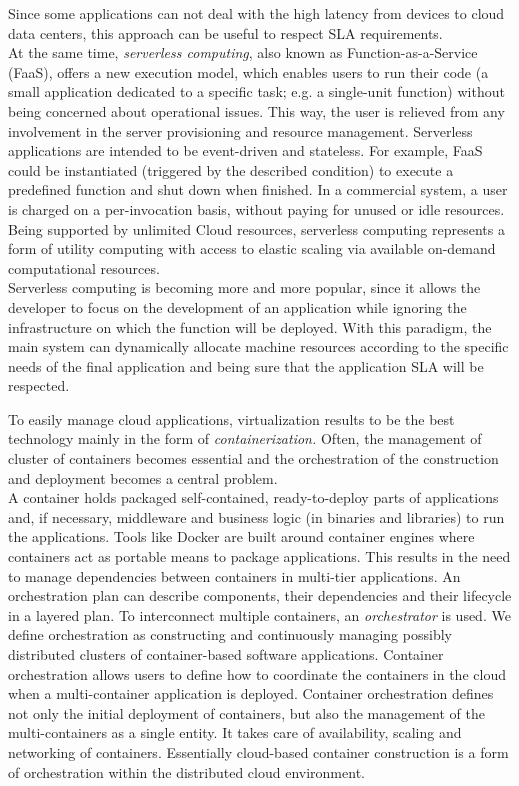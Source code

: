 Since some applications can not deal with the high latency from devices to cloud data centers, this approach
can be useful to respect SLA requirements. \\
At the same time, \textit{serverless computing}, also known as Function-as-a-Service (FaaS), offers a new execution model, which enables users
to run their code (a small application dedicated to a specific task; e.g. a single-unit function) without being concerned
about operational issues. This way, the user is relieved from any involvement in the server provisioning and resource
management. Serverless applications are intended to be event-driven and stateless.
For example, FaaS could be instantiated (triggered by the described condition) to execute a predefined function
and shut down when finished. In a commercial system, a user is charged on a per-invocation basis, without paying
for unused or idle resources. Being supported by unlimited Cloud resources, serverless computing represents a form
of utility computing with access to elastic scaling via available on-demand computational resources.\cite{Serverless} \\
Serverless computing is becoming more and more popular, since it allows the developer to focus on the development of an application
while ignoring the infrastructure on which the function will be deployed. With this paradigm, the main
system can dynamically allocate machine resources according to the specific needs of the final application and
being sure that the application SLA will be respected.

To easily manage cloud applications, virtualization results to be the best technology mainly in the form of
\textit{containerization.} Often, the management of cluster of containers becomes essential and the orchestration of the
construction and deployment becomes a central problem.\\
A container holds packaged self-contained, ready-to-deploy parts of applications and, if necessary, middleware and business
logic (in binaries and libraries) to run the applications. Tools like Docker are built around container engines where
containers act as portable means to package applications. This results in the need to manage dependencies between containers
in multi-tier applications. An orchestration plan can describe components, their dependencies and their lifecycle in a layered plan.
To interconnect multiple containers, an \textit{orchestrator} is used. We define orchestration as constructing
and continuously managing possibly distributed clusters of container-based software applications. Container orchestration
allows users to define how to coordinate the containers in the cloud when a multi-container application is deployed.
Container orchestration defines not only the initial deployment of containers, but also the management of the multi-containers
as a single entity. It takes care of availability, scaling and networking of containers. Essentially cloud-based container
construction is a form of orchestration within the distributed cloud environment.\cite{Containers}

